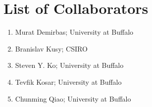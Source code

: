 \chapter{List of Collaborators}
\thispagestyle{empty}

\begin{enumerate}
  \item Murat Demirbas; University at Buffalo
  \item Branislav Kusy; CSIRO
  \item Steven Y. Ko; University at Buffalo
  \item Tevfik Kosar; University at Buffalo
  \item Chunming Qiao; University at Buffalo
\end{enumerate}
